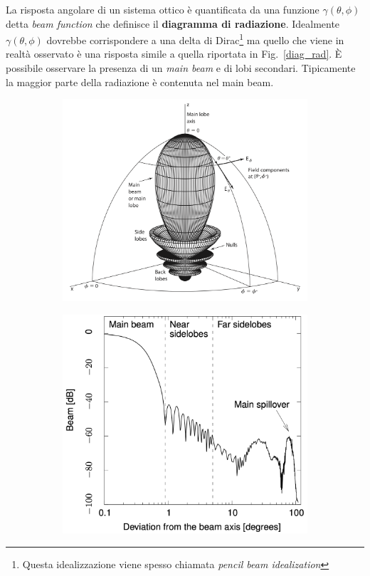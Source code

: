 \documentclass[12pt,a4paper,final]{book}
\begin{document}
La risposta angolare di un sistema ottico è quantificata da una funzione $\gamma(\theta,\phi)$ detta \textit{beam function} che definisce il \textbf{diagramma di radiazione}. Idealmente $\gamma(\theta,\phi)$ dovrebbe corrispondere a una delta di Dirac\footnote{Questa idealizzazione viene spesso chiamata \textit{pencil beam idealization}} ma quello che viene in realtà osservato è una risposta simile a quella riportata in Fig.~\ref{diag_rad}.
\`E possibile osservare la presenza di un \textit{main beam} e di lobi secondari. Tipicamente la maggior parte della radiazione è contenuta nel main beam.
\begin{figure}[!ht]
\centering
	\begin{subfigure}{0.5\textwidth}
	    \centering
	    \includegraphics[width=\linewidth]{../figures/diag_rad}
	    \caption{}
	    \label{beam}
	\end{subfigure}
	\begin{subfigure}{0.45\textwidth}
		\centering
	    \includegraphics[width=\linewidth]{../figures/risposta_ottica.png}

\end{subfigure}
\end{figure}
\end{document}
